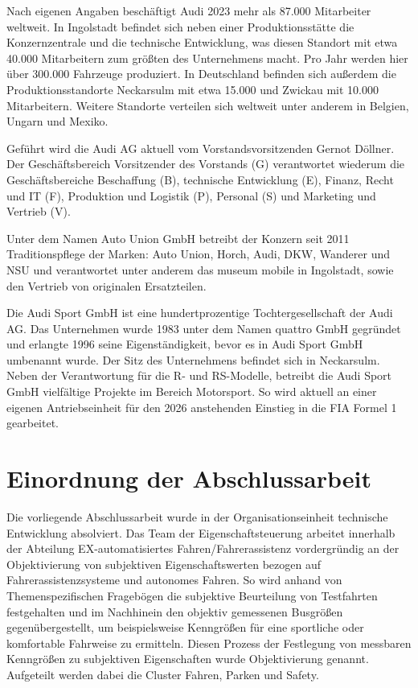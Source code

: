         Nach eigenen Angaben beschäftigt Audi 2023 mehr als 87.000 Mitarbeiter weltweit. In Ingolstadt befindet sich neben einer Produktionsstätte die Konzernzentrale und die technische Entwicklung, was diesen Standort mit etwa 40.000 Mitarbeitern zum größten des Unternehmens macht.
        Pro Jahr werden hier über 300.000 Fahrzeuge produziert. In Deutschland befinden sich außerdem die Produktionsstandorte Neckarsulm mit etwa 15.000 und Zwickau mit 10.000 Mitarbeitern. Weitere Standorte verteilen sich weltweit unter anderem in Belgien, Ungarn und Mexiko.
        
        Geführt wird die Audi AG aktuell vom Vorstandsvorsitzenden Gernot Döllner. Der Geschäftsbereich Vorsitzender des Vorstands (G) verantwortet wiederum die Geschäftsbereiche Beschaffung (B), technische Entwicklung (E), Finanz, Recht und IT (F), Produktion und Logistik (P), Personal (S) und Marketing und Vertrieb (V). \cite{AudiCompany}

        Unter dem Namen Auto Union GmbH betreibt der Konzern seit 2011 Traditionspflege der Marken: Auto Union, Horch, Audi, DKW, Wanderer und NSU und verantwortet unter anderem das museum mobile in Ingolstadt, sowie den Vertrieb von originalen Ersatzteilen.
        
        Die Audi Sport GmbH ist eine hundertprozentige Tochtergesellschaft der Audi AG. Das Unternehmen wurde 1983 unter dem Namen quattro GmbH gegründet und erlangte 1996 seine Eigenständigkeit, bevor es in Audi Sport GmbH umbenannt wurde. Der Sitz des Unternehmens befindet sich in Neckarsulm. Neben der Verantwortung für die R- und RS-Modelle, betreibt die Audi Sport GmbH vielfältige Projekte im Bereich Motorsport. So wird aktuell an einer eigenen Antriebseinheit für den 2026 anstehenden Einstieg in die FIA Formel 1 gearbeitet.

        
    \section{Einordnung der Abschlussarbeit}
        Die vorliegende Abschlussarbeit wurde in der Organisationseinheit technische Entwicklung absolviert. Das Team der Eigenschaftsteuerung arbeitet innerhalb der Abteilung EX-automatisiertes Fahren/Fahrerassistenz vordergründig an der Objektivierung von subjektiven Eigenschaftswerten bezogen auf Fahrerassistenzsysteme und autonomes Fahren. So wird anhand von Themenspezifischen Fragebögen die subjektive Beurteilung von Testfahrten festgehalten und im Nachhinein den objektiv gemessenen Busgrößen gegenübergestellt, um beispielsweise Kenngrößen für eine sportliche oder komfortable Fahrweise zu ermitteln. Diesen Prozess der Festlegung von messbaren Kenngrößen zu subjektiven Eigenschaften wurde Objektivierung genannt. Aufgeteilt werden dabei die Cluster Fahren, Parken und Safety.

